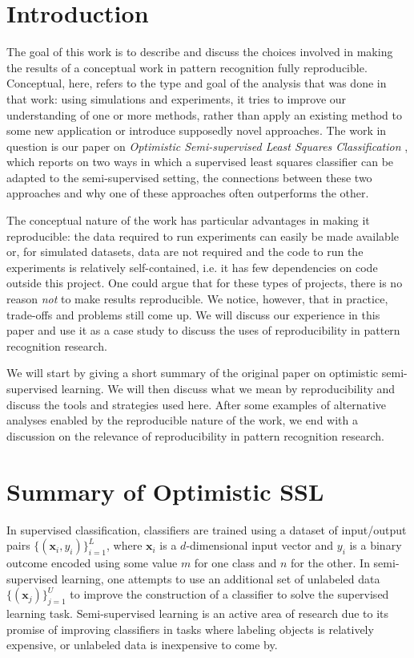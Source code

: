 \documentclass[twoside]{memoir}\usepackage[]{graphicx}\usepackage{xcolor}
\begin{document}
\section{Introduction}
The goal of this work is to describe and discuss the choices involved in making the results of a conceptual work in pattern recognition fully reproducible. Conceptual, here, refers to the type and goal of the analysis that was done in that work: using simulations and experiments, it tries to improve our understanding of one or more methods, rather than apply an existing method to some new application or introduce supposedly novel approaches. The work in question is our paper on \textit{Optimistic Semi-supervised Least Squares Classification} \citep{Krijthe2016a}, which reports on two ways in which a supervised least squares classifier can be adapted to the semi-supervised setting, the connections between these two approaches and why one of these approaches often outperforms the other.

The conceptual nature of the work has particular advantages in making it reproducible: the data required to run experiments can easily be made available or, for simulated datasets, data are not required and the code to run the experiments is relatively self-contained, i.e. it has few dependencies on code outside this project. One could argue that for these types of projects, there is no reason \emph{not} to make results reproducible. We notice, however, that in practice, trade-offs and problems still come up. We will discuss our experience in this paper and use it as a case study to discuss the uses of reproducibility in pattern recognition research.

We will start by giving a short summary of the original paper on optimistic semi-supervised learning. We will then discuss what we mean by reproducibility and discuss the tools and strategies used here. After some examples of alternative analyses enabled by the reproducible nature of the work, we end with a discussion on the relevance of reproducibility in pattern recognition research.

\section{Summary of Optimistic SSL}
In supervised classification, classifiers are trained using a dataset of input/output pairs $\{(\mathbf{x}_i,y_i)\}^L_{i=1}$, where $\mathbf{x}_i$ is a $d$-dimensional input vector and $y_i$ is a binary outcome encoded using some value $m$ for one class and $n$ for the other. In semi-supervised learning, one attempts to use an additional set of unlabeled data $\{(\mathbf{x}_j)\}^U_{j=1}$ to improve the construction of a classifier to solve the supervised learning task. Semi-supervised learning is an active area of research due to its promise of improving classifiers in tasks where labeling objects is relatively expensive, or unlabeled data is inexpensive to come by.
\end{document}
